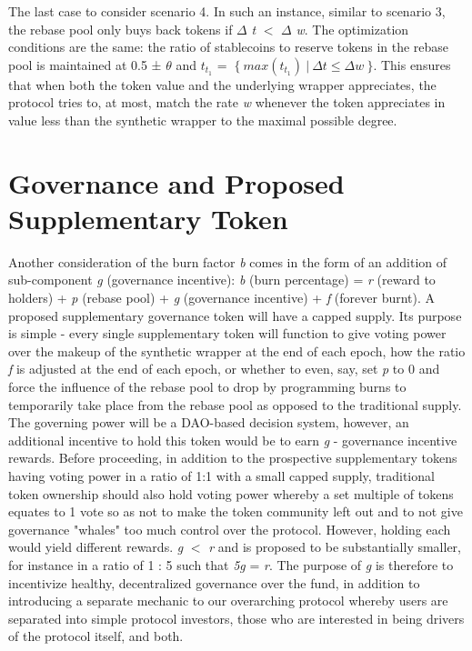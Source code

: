 \documentclass[12pt]{article}
\begin{document}
    \vspace{0.15cm}
    The last case to consider scenario 4. In such an instance, similar to scenario 3, the rebase pool only buys back tokens if $\Delta$ \emph{t} $<$ $\Delta$ \emph{w}. The optimization conditions are the same: the ratio of stablecoins to reserve tokens in the rebase pool is maintained at 0.5 ± $\theta$ and \emph{$t_{t_1}$} = $~\{~max(t_{t_1})~|~\Delta t \leq \Delta w~\}$. This ensures that when both the token value and the underlying wrapper appreciates, the protocol tries to, at most, match the rate \emph{w} whenever the token appreciates in value less than the synthetic wrapper to the maximal possible degree.

\section{Governance and Proposed Supplementary Token}

    Another consideration of the burn factor \emph{b} comes in the form of an addition of sub-component \emph{g} (governance incentive): \emph{b} (burn percentage) = \emph{r} (reward to holders) + \emph{p} (rebase pool) + \emph{g} (governance incentive) + \emph{f} (forever burnt). A proposed supplementary governance token will have a capped supply. Its purpose is simple - every single supplementary token will function to give voting power over the makeup of the synthetic wrapper at the end of each epoch, how the ratio \emph{f} is adjusted at the end of each epoch, or whether to even, say, set \emph{p} to 0 and force the influence of the rebase pool to drop by programming burns to temporarily take place from the rebase pool as opposed to the traditional supply. The governing power will be a DAO-based decision system, however, an additional incentive to hold this token would be to earn \emph{g} - governance incentive rewards. Before proceeding, in addition to the prospective supplementary tokens having voting power in a ratio of 1:1 with a small capped supply, traditional token ownership should also hold voting power whereby a set multiple of tokens equates to 1 vote so as not to make the token community left out and to not give governance "whales" too much control over the protocol. However, holding each would yield different rewards. \emph{g} $<$ \emph{r} and is proposed to be substantially smaller, for instance in a ratio of 1 : 5 such that \emph{5g} = \emph{r}. The purpose of \emph{g} is therefore to incentivize healthy, decentralized governance over the fund, in addition to introducing a separate mechanic to our overarching protocol whereby users are separated into simple protocol investors, those who are interested in being drivers of the protocol itself, and both.
\end{document}
